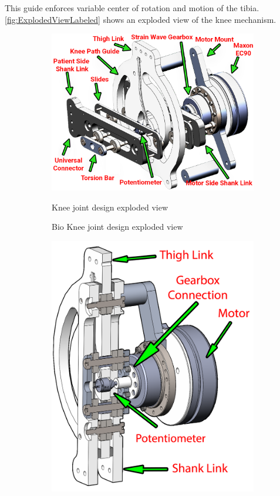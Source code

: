 This guide enforces variable center of rotation and motion of the tibia. \autoref{fig:ExplodedViewLabeled} shows an exploded view of the knee mechanism. 



\begin{figure}
    \begin{subfigure}{\textwidth}
        \centering
        \captionsetup{justification=centering}
        \includegraphics[scale=0.2]{images/mech_design/ExoKneeExplodedView.png}
        \caption{Bio Knee joint design exploded view}{Knee joint design exploded view}
        \label{fig:ExplodedViewLabeled}
    \end{subfigure}
    \begin{subfigure}{\textwidth}
        \centering
         \includegraphics[scale=0.2]{images/mech_design/KneeJointAssyCrossSection.png}

\end{subfigure}
\end{figure}

